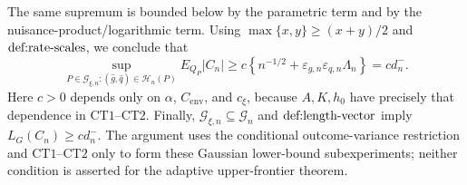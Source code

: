 The same supremum is bounded below by the parametric term and by the nuisance-product/logarithmic term.  Using \(\max\{x,y\}\ge(x+y)/2\) and \(\textup{def:rate-scales}\), we conclude that
\[
 \sup_{P\in\mathcal G_{\xi,n}:(\widehat g,\widehat q)\in\mathcal H_n(P)}
 E_{Q_P}|C_n|
 \ge c\left\{n^{-1/2}
 +\varepsilon_{g,n}\varepsilon_{q,n}\Lambda_n\right\}
 =c d_n^-.
\]
Here \(c>0\) depends only on \(\alpha\), \(C_{\mathrm{env}}\), and \(c_\xi\), because \(A,K,h_0\) have precisely that dependence in \(\mathrm{CT1}\)--\(\mathrm{CT2}\).  Finally, \(\mathcal G_{\xi,n}\subseteq\mathcal G_n\) and \(\textup{def:length-vector}\) imply \(L_G(C_n)\ge c d_n^-\).  The argument uses the conditional outcome-variance restriction and \(\mathrm{CT1}\)--\(\mathrm{CT2}\) only to form these Gaussian lower-bound subexperiments; neither condition is asserted for the adaptive upper-frontier theorem.
